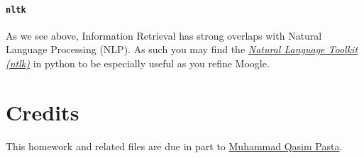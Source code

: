 \documentclass[addpoints]{exam}
\begin{document}
\paragraph{\texttt{nltk}} As we see above, Information Retrieval has strong overlaps with Natural Language Processing (NLP). As such you may find the \href{https://www.nltk.org}{\textit{Natural Language Toolkit (ntlk)}} in python to be especially useful as you refine Moogle.

\section*{Credits}

This homework and related files are due in part to \href{http://qasimpasta.info}{Muhammad Qasim Pasta}.
\end{document}

